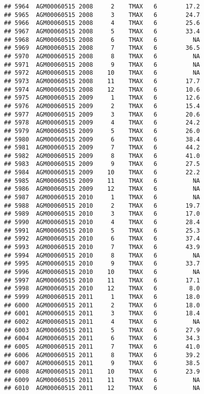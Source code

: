 \documentclass{article}\usepackage[]{graphicx}\usepackage[]{color}
\makeatletter
\newenvironment{kframe}{%
 \def\at@end@of@kframe{}%
 \ifinner\ifhmode%
  \def\at@end@of@kframe{\end{minipage}}%
  \begin{minipage}{\columnwidth}%
 \fi\fi%
 \def\FrameCommand##1{\hskip\@totalleftmargin \hskip-\fboxsep
 \colorbox{shadecolor}{##1}\hskip-\fboxsep
     \hskip-\linewidth \hskip-\@totalleftmargin \hskip\columnwidth}%
 \MakeFramed {\advance\hsize-\width
   \@totalleftmargin\z@ \linewidth\hsize
   \@setminipage}}%
 {\par\unskip\endMakeFramed%
 \at@end@of@kframe}
\newenvironment{knitrout}{}{} %
\makeatother
\begin{document}
\begin{knitrout}
\begin{kframe}
\begin{verbatim}
## 5964  AGM00060515 2008     2    TMAX   6        17.2
## 5965  AGM00060515 2008     3    TMAX   6        24.7
## 5966  AGM00060515 2008     4    TMAX   6        25.6
## 5967  AGM00060515 2008     5    TMAX   6        33.4
## 5968  AGM00060515 2008     6    TMAX   6          NA
## 5969  AGM00060515 2008     7    TMAX   6        36.5
## 5970  AGM00060515 2008     8    TMAX   6          NA
## 5971  AGM00060515 2008     9    TMAX   6          NA
## 5972  AGM00060515 2008    10    TMAX   6          NA
## 5973  AGM00060515 2008    11    TMAX   6        17.7
## 5974  AGM00060515 2008    12    TMAX   6        10.6
## 5975  AGM00060515 2009     1    TMAX   6        12.6
## 5976  AGM00060515 2009     2    TMAX   6        15.4
## 5977  AGM00060515 2009     3    TMAX   6        20.6
## 5978  AGM00060515 2009     4    TMAX   6        24.2
## 5979  AGM00060515 2009     5    TMAX   6        26.0
## 5980  AGM00060515 2009     6    TMAX   6        38.4
## 5981  AGM00060515 2009     7    TMAX   6        44.2
## 5982  AGM00060515 2009     8    TMAX   6        41.0
## 5983  AGM00060515 2009     9    TMAX   6        27.5
## 5984  AGM00060515 2009    10    TMAX   6        22.2
## 5985  AGM00060515 2009    11    TMAX   6          NA
## 5986  AGM00060515 2009    12    TMAX   6          NA
## 5987  AGM00060515 2010     1    TMAX   6          NA
## 5988  AGM00060515 2010     2    TMAX   6        19.7
## 5989  AGM00060515 2010     3    TMAX   6        17.0
## 5990  AGM00060515 2010     4    TMAX   6        28.4
## 5991  AGM00060515 2010     5    TMAX   6        25.3
## 5992  AGM00060515 2010     6    TMAX   6        37.4
## 5993  AGM00060515 2010     7    TMAX   6        43.9
## 5994  AGM00060515 2010     8    TMAX   6          NA
## 5995  AGM00060515 2010     9    TMAX   6        33.7
## 5996  AGM00060515 2010    10    TMAX   6          NA
## 5997  AGM00060515 2010    11    TMAX   6        17.1
## 5998  AGM00060515 2010    12    TMAX   6         8.0
## 5999  AGM00060515 2011     1    TMAX   6        18.0
## 6000  AGM00060515 2011     2    TMAX   6        18.0
## 6001  AGM00060515 2011     3    TMAX   6        18.4
## 6002  AGM00060515 2011     4    TMAX   6          NA
## 6003  AGM00060515 2011     5    TMAX   6        27.9
## 6004  AGM00060515 2011     6    TMAX   6        34.3
## 6005  AGM00060515 2011     7    TMAX   6        41.0
## 6006  AGM00060515 2011     8    TMAX   6        39.2
## 6007  AGM00060515 2011     9    TMAX   6        38.5
## 6008  AGM00060515 2011    10    TMAX   6        23.9
## 6009  AGM00060515 2011    11    TMAX   6          NA
## 6010  AGM00060515 2011    12    TMAX   6          NA

\end{verbatim}
\end{kframe}
\end{knitrout}
\end{document}
